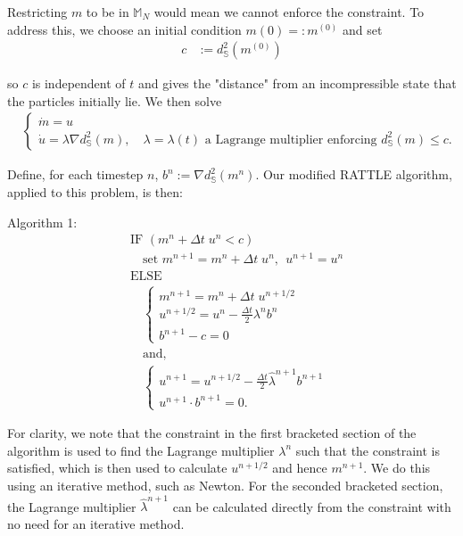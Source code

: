 \documentclass[11pt, oneside]{article}   	%
\newcommand{\MN}{\mathbb{M}_N}
\newcommand{\dsmsq}{d^{2}_{\mathbb{S}}(m)}
\newcommand{\graddsmsq}{\nabla{d^{2}_{\mathbb{S}}(m)}}
\newcommand{\dt}{\Delta t}
\begin{document}
Restricting \(m\) to be in \(\MN\) would mean we cannot enforce the constraint. To address this, we choose an initial condition \(m(0) =: m^{(0)}\) and set
\begin{align}
c &:= d^{2}_{\mathbb{S}}(m^{(0)})
\end{align}

so \(c\) is independent of \(t\) and gives the "distance" from an incompressible state that the particles initially lie. We then solve
\begin{align}
 &\begin{cases}
  \dot{m} = u \\
  \dot{u} = \lambda \graddsmsq, \quad \lambda = \lambda(t) \text{ a Lagrange multiplier enforcing } \dsmsq \le c.
 \end{cases} 
\end{align}

Define, for each timestep \(n\), \(b^n := \nabla{d^{2}_{\mathbb{S}}(m^n)}\). Our modified RATTLE algorithm, applied to this problem, is then:

Algorithm 1:
\begin{align*}
 &\text{IF } (m^n + \dt \; u^n < c) \\
 &\quad \text{set } m^{n+1} = m^n + \dt \; u^n, \: \: u^{n+1} = u^n \\
 &\text{ELSE } \\
 &\quad 
 \begin{cases}
  m^{n+1} = m^{n} + \dt \; u^{n+1/2}  \\
  u^{n+1/2} = u^n - \frac{\dt}{2} \lambda^n b^n \\
  b^{n+1} - c = 0
 \end{cases} \\
 &\quad 
 \text{and, } \nonumber \\
 &\quad 
 \begin{cases}
  u^{n+1} = u^{n+1/2} - \frac{\dt}{2} \hat{\lambda}^{n+1} b^{n+1} \\
  u^{n+1} \cdot b^{n+1} = 0.
 \end{cases} 
\end{align*}

For clarity, we note that the constraint in the first bracketed section of the algorithm is used to find the Lagrange multiplier \(\lambda^n\) such that the constraint is satisfied, which is then used to calculate \(u^{n+1/2}\) and hence \(m^{n+1}\). We do this using an iterative method, such as Newton. For the seconded bracketed section, the Lagrange multiplier \(\hat{\lambda}^{n+1}\) can be calculated directly from the constraint with no need for an iterative method.
\end{document}

